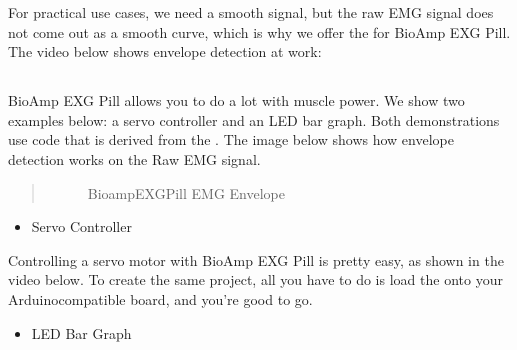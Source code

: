 \documentclass[a4paper,10pt,english,oneside]{sphinxmanual}
\let\sphinxpxdimen\pdfpxdimen\else\newdimen\sphinxpxdimen
\begin{document}
\begin{DUlineblock}{0em}
\item[] 
\end{DUlineblock}

\sphinxAtStartPar
For practical use cases, we need a smooth signal, but the raw EMG signal does not come out as a smooth curve, which is why we offer the  for BioAmp EXG Pill. The video below shows envelope detection at work:


\subsection{}
\label{\detokenize{applications/index:example-emg-projects-with-bioamp-exg-pill}}
\sphinxAtStartPar
BioAmp EXG Pill allows you to do a lot with muscle power. We show two examples below: a servo controller and an LED bar graph. Both demonstrations use code that is derived from the  . The image below shows how envelope detection works on the Raw EMG signal.
\begin{quote}

\begin{figure}[htbp]
\centering
\capstart

\noindent\sphinxincludegraphics[width=600\sphinxpxdimen]{{bioamp-exg-pill-emgenvelope}.jpg}
\caption{Bioamp\sphinxhyphen{}EXG\sphinxhyphen{}Pill EMG Envelope}\label{\detokenize{applications/index:id20}}\end{figure}
\end{quote}

\begin{DUlineblock}{0em}
\item[] 
\end{DUlineblock}
\begin{itemize}
\item {} 
\sphinxAtStartPar
Servo Controller

\end{itemize}

\sphinxAtStartPar
Controlling a servo motor with BioAmp EXG Pill is pretty easy, as shown in the video below. To create the same project, all you have to do is load the  onto your Arduino\sphinxhyphen{}compatible board, and you’re good to go.
\begin{itemize}
\item {} 
\sphinxAtStartPar
LED Bar Graph

\end{itemize}
\end{document}
